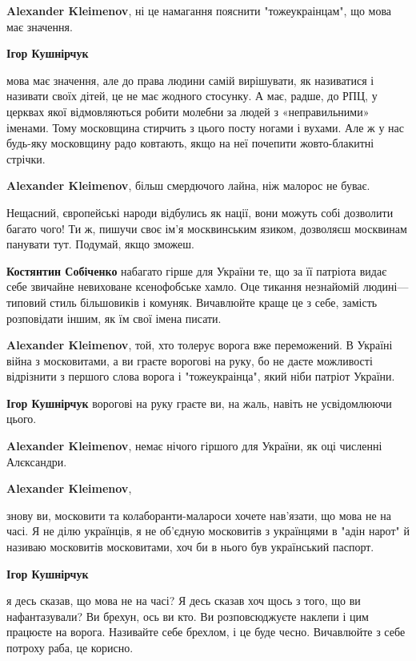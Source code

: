 \begin{itemize}
\begin{itemize}
\textbf{Alexander Kleimenov}, ні це намагання пояснити "тожеукраінцам", що мова має значення.

\textbf{Ігор Кушнірчук} 

мова має значення, але до права людини самій вирішувати, як називатися і
називати своїх дітей, це не має жодного стосунку. А має, радше, до РПЦ, у
церквах якої відмовляються робити молебни за людей з «неправильними» іменами.
Тому московщина стирчить з цього посту ногами і вухами. Але ж у нас будь-яку
московщину радо ковтають, якщо на неї почепити жовто-блакитні стрічки.

\textbf{Alexander Kleimenov}, більш смердючого лайна, ніж малорос не буває.

Нещасний, європейські народи відбулись як нації, вони можуть собі дозволити
багато чого! Ти ж, пишучи своє ім'я москвинським язиком, дозволяєш москвинам
панувати тут. Подумай, якщо зможеш.

\textbf{Костянтин Собіченко} набагато гірше для України те, що за її патріота видає себе звичайне невиховане ксенофобське хамло. Оце тикання незнайомій людині—типовий стиль більшовиків і комуняк. Вичавлюйте краще це з себе, замість розповідати іншим, як їм свої імена писати.

\textbf{Alexander Kleimenov}, той, хто толерує ворога вже переможений. В Україні війна з московитами, а ви граєте ворогові на руку, бо не даєте можливості відрізнити з першого слова ворога і "тожеукраінца", який ніби патріот України.

\textbf{Ігор Кушнірчук} ворогові на руку граєте ви, на жаль, навіть не усвідомлюючи цього.

\textbf{Alexander Kleimenov}, немає нічого гіршого для України, як оці численні Алєксандри.

\textbf{Alexander Kleimenov}, 

знову ви, московити та колаборанти-малароси хочете нав'язати, що мова не на
часі. Я не ділю українців, я не об'єдную московитів з українцями в "адін нарот"
й називаю московитів московитами, хоч би в нього був український паспорт.

\textbf{Ігор Кушнірчук} 

я десь сказав, що мова не на часі? Я десь сказав хоч щось з того, що ви
нафантазували? Ви брехун, ось ви кто. Ви розповсюджуєте наклепи і цим працюєте
на ворога. Називайте себе брехлом, і це буде чесно. Вичавлюйте з себе потроху
раба, це корисно.



\end{itemize}
\end{itemize}
